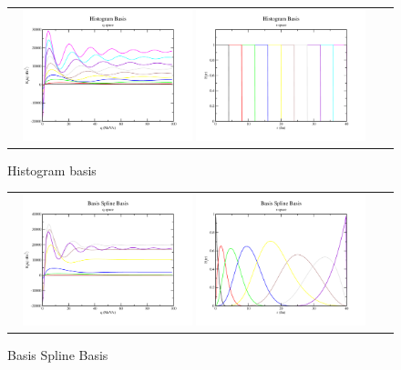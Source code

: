 \documentclass[aps,prl,twocolumn,floatfix,preprintnumbers,showpacs]{revtex4}
\begin{document}
\begin{figure}
\begin{tabular}{cc}        
\includegraphics[width=0.47\textwidth]{basis_function_plots/Histogram_Basis_q}    
\includegraphics[width=0.47\textwidth]{basis_function_plots/Histogram_Basis_r}    
\end{tabular}    
\caption{\label{Histogram} Histogram basis}    
\end{figure}

\begin{figure}
\begin{tabular}{cc}        
\includegraphics[width=0.47\textwidth]{basis_function_plots/BasisSpline_Basis_q}    
\includegraphics[width=0.47\textwidth]{basis_function_plots/BasisSpline_Basis_r}    
\end{tabular}    
\caption{\label{BasisSpline} Basis Spline Basis}    
\end{figure}
\end{document}
